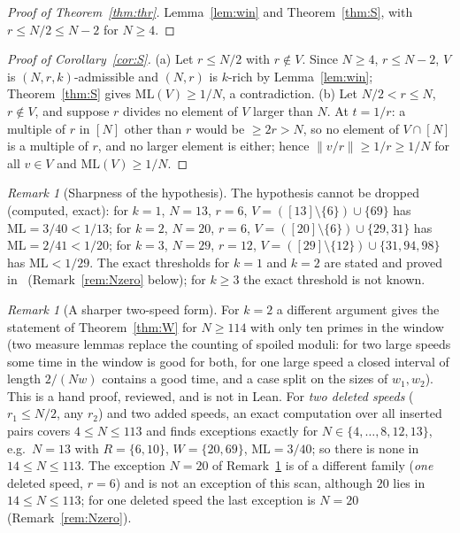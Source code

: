 \documentclass[11pt]{article}
\theoremstyle{definition}
\theoremstyle{remark}
\newtheorem{remark}[theorem]{Remark}
\newcommand{\nd}[1]{\lVert #1\rVert}
\newcommand{\ML}{\mathrm{ML}}
\newcommand{\xA}[1]{\ref{A1-#1}}
\begin{document}
\begin{proof}[Proof of Theorem~\ref{thm:thr}]
Lemma~\ref{lem:win} and Theorem~\ref{thm:S}, with $r\le N/2\le N-2$ for $N\ge4$.
\end{proof}

\begin{proof}[Proof of Corollary~\ref{cor:S}]
(a) Let $r\le N/2$ with $r\notin V$. Since $N\ge4$, $r\le N-2$, $V$ is $(N,r,k)$-admissible and $(N,r)$ is $k$-rich by Lemma~\ref{lem:win}; Theorem~\ref{thm:S} gives $\ML(V)\ge1/N$, a contradiction. (b) Let $N/2<r\le N$, $r\notin V$, and suppose $r$ divides no element of $V$ larger than $N$. At $t=1/r$: a multiple of $r$ in $[N]$ other than $r$ would be $\ge2r>N$, so no element of $V\cap[N]$ is a multiple of $r$, and no larger element is either; hence $\nd{v/r}\ge1/r\ge1/N$ for all $v\in V$ and $\ML(V)\ge1/N$.
\end{proof}

\begin{remark}[Sharpness of the hypothesis]\label{rem:sharp}
The hypothesis cannot be dropped (computed, exact): for $k=1$, $N=13$, $r=6$, $V=([13]\setminus\{6\})\cup\{69\}$ has $\ML=3/40<1/13$; for $k=2$, $N=20$, $r=6$, $V=([20]\setminus\{6\})\cup\{29,31\}$ has $\ML=2/41<1/20$; for $k=3$, $N=29$, $r=12$, $V=([29]\setminus\{12\})\cup\{31,94,98\}$ has $\ML<1/29$. The exact thresholds for $k=1$ and $k=2$ are stated and proved in~\cite[Theorem~\xA{thm:OE}, Proposition~\xA{prop:N0}]{A1} (Remark~\ref{rem:Nzero} below); for $k\ge3$ the exact threshold is not known.
\end{remark}

\begin{remark}[A sharper two-speed form]\label{rem:Wsharp}
For $k=2$ a different argument gives the statement of Theorem~\ref{thm:W} for $N\ge114$ with only ten primes in the window (two measure lemmas replace the counting of spoiled moduli: for two large speeds some time in the window is good for both, for one large speed a closed interval of length $2/(Nw)$ contains a good time, and a case split on the sizes of $w_1,w_2$). This is a hand proof, reviewed, and is not in Lean. For \emph{two deleted speeds} ($r_1\le N/2$, any $r_2$) and two added speeds, an exact computation over all inserted pairs covers $4\le N\le113$ and finds exceptions exactly for $N\in\{4,\dots,8,12,13\}$, e.g.\ $N=13$ with $R=\{6,10\}$, $W=\{20,69\}$, $\ML=3/40$; so there is none in $14\le N\le113$. The exception $N=20$ of Remark~\ref{rem:sharp} is of a different family (\emph{one} deleted speed, $r=6$) and is not an exception of this scan, although $20$ lies in $14\le N\le113$; for one deleted speed the last exception is $N=20$ (Remark~\ref{rem:Nzero}).
\end{remark}
\end{document}
